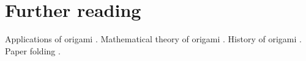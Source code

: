 

\section*{Further reading}

Applications of origami \cite{lang-ted}. Mathematical theory of origami \cite{alperin,moti-origami}. History of origami \cite{history}. Paper folding \cite{lang,newton}.




